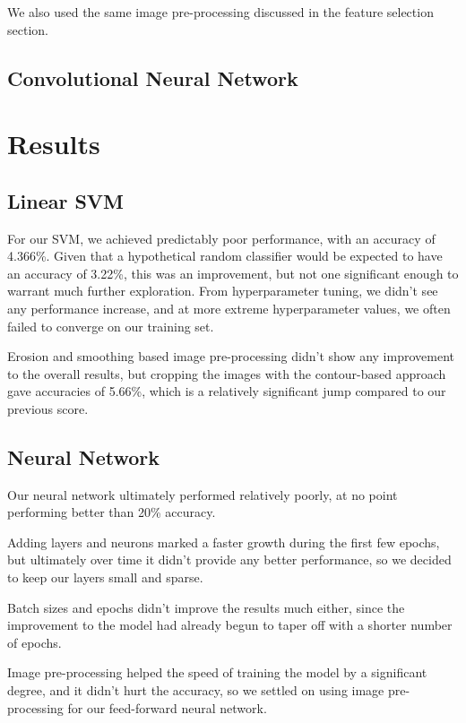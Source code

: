 \documentclass[conference]{IEEEtran}
\begin{document}
We also used the same image pre-processing discussed in the feature selection section.

\subsection{Convolutional Neural Network}


\section{\textbf{Results}}

\subsection{Linear SVM}

For our SVM, we achieved predictably poor performance, with an accuracy of 4.366\%. Given that a hypothetical random classifier would be expected to have an accuracy of 3.22\%, this was an improvement, but not one significant enough to warrant much further exploration. From hyperparameter tuning, we didn't see any performance increase, and at more extreme hyperparameter values, we often failed to converge on our training set.

Erosion and smoothing based image pre-processing didn't show any improvement to the overall results, but cropping the images with the contour-based approach gave accuracies of 5.66\%, which is a relatively significant jump compared to our previous score.

\subsection{Neural Network}

Our neural network ultimately performed relatively poorly, at no point performing better than 20\% accuracy.

Adding layers and neurons marked a faster growth during the first few epochs, but ultimately over time it didn't provide any better performance, so we decided to keep our layers small and sparse.

Batch sizes and epochs didn't improve the results much either, since the improvement to the model had already begun to taper off with a shorter number of epochs.

Image pre-processing helped the speed of training the model by a significant degree, and it didn't hurt the accuracy, so we settled on using image pre-processing for our feed-forward neural network.
\end{document}
